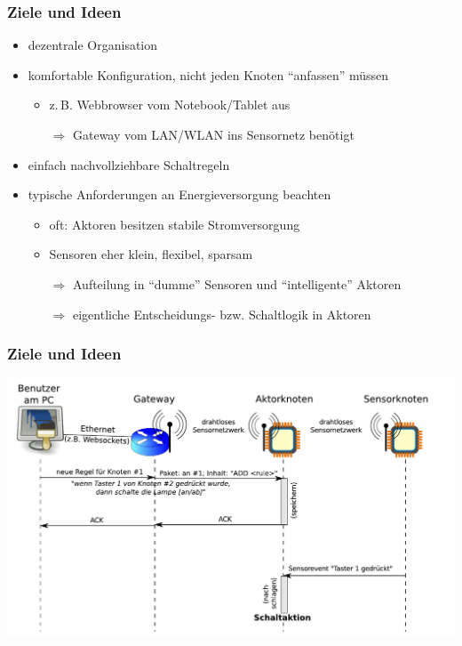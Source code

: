 \documentclass[t,compress,logoflat,faulogo]{beamer}
\newcommand{\customitemsep}{7pt}
\newcommand{\customitemsepsub}{2pt}
\begin{document}
\begin{frame}
    \frametitle{Ziele und Ideen}

		    \begin{itemize} \setlength{\itemsep}{\customitemsep}
		        \item dezentrale Organisation
		        \item komfortable Konfiguration, nicht jeden Knoten \enquote{anfassen} müssen
		            \begin{itemize} \setlength{\itemsep}{\customitemsepsub}
		                \item z.\,B. Webbrowser vom Notebook/Tablet aus
		                \item[$\Rightarrow$] Gateway vom LAN/WLAN ins Sensornetz benötigt
		            \end{itemize}

		        \pause
		        \item einfach nachvollziehbare Schaltregeln
		        \item typische Anforderungen an Energieversorgung beachten
		            \begin{itemize} \setlength{\itemsep}{\customitemsepsub}
		                \item oft: Aktoren besitzen stabile Stromversorgung
		                \item Sensoren eher klein, flexibel, sparsam
		                \item[$\Rightarrow$] Aufteilung in \enquote{dumme} Sensoren und \enquote{intelligente} Aktoren
		                \item[$\Rightarrow$] eigentliche Entscheidungs- bzw. Schaltlogik in Aktoren
		            \end{itemize}

		    \end{itemize}
\end{frame}

\begin{frame}
    \frametitle{Ziele und Ideen}
    \includegraphics[width=1\linewidth]{img/seq_diag_config_and_do.pdf}
\end{frame}
\end{document}
